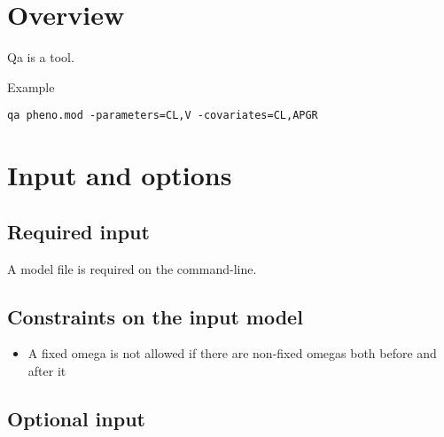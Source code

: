 



\maketitle
\newcommand{\guidetoolname}{qa}


\section{Overview}
Qa is a tool.

Example
\begin{verbatim}
qa pheno.mod -parameters=CL,V -covariates=CL,APGR
\end{verbatim}

\section{Input and options}

\subsection{Required input}
A model file is required on the command-line.

\subsection{Constraints on the input model}
\begin{itemize}
	\item A fixed omega is not allowed if there are non-fixed omegas both before and after it
\end{itemize}



\subsection{Optional input}




